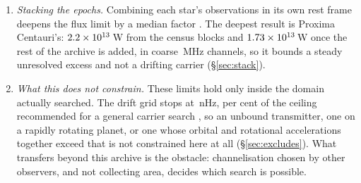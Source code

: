\begin{enumerate}[leftmargin=1.6em,itemsep=4pt,topsep=4pt,parsep=0pt]
\item \emph{Stacking the epochs.} Combining each star's observations in its
own rest frame deepens the flux limit by a median factor \SyStkGainMed. The
deepest result is Proxima Centauri's: $2.2\times10^{13}$\,W from the census
blocks and $1.73\times10^{13}$\,W once the rest of the archive is added, in
coarse \ChanBModeMHz\,MHz channels, so it bounds a steady unresolved excess
and not a drifting carrier (\S\ref{sec:stack}).

\item \emph{What this does not constrain.} These limits hold only inside the
domain actually searched. The drift grid stops at \DriftCeilLo\,nHz,
\AccelSheikhPct{} per cent of the ceiling recommended for a general carrier
search \citep{Sheikh2019}, so an unbound transmitter, one on a rapidly
rotating planet, or one whose orbital and rotational accelerations together
exceed that is not constrained here at all (\S\ref{sec:excludes}). What
transfers beyond this archive is the obstacle: channelisation chosen by other
observers, and not collecting area, decides which search is possible.

\end{enumerate}
